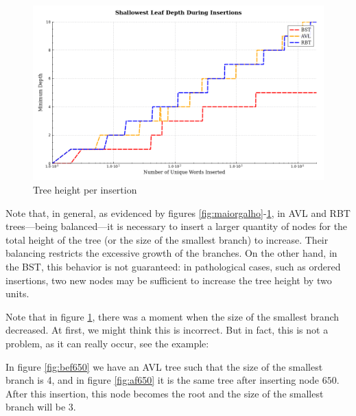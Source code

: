 \begin{figure}[H]
    \centering
    \includegraphics[width=0.75\linewidth]{img/Graph_2_10103.pdf}
    \caption{Tree height per insertion}
    \label{fig:menorgalho}
\end{figure}

Note that, in general, as evidenced by figures \ref{fig:maiorgalho}-\ref{fig:menorgalho}, in AVL and RBT trees—being balanced—it is necessary to insert a larger quantity
of nodes for the total height of the tree (or the size of the smallest branch) to increase. Their balancing restricts the excessive growth of the branches.
On the other hand, in the BST, this behavior is not guaranteed: in pathological cases, such as ordered insertions,
two new nodes may be sufficient to increase the tree height by two units.

Note that in figure \ref{fig:menorgalho}, there was a moment when the size of the smallest branch decreased. At first,
we might think this is incorrect. But in fact, this is not a problem,
as it can really occur, see the example:

In figure \ref{fig:bef650} we have an AVL tree such that the size of the smallest branch is 4, and in figure
\ref{fig:af650} it is the same tree after inserting node $650$. After this insertion,
this node becomes the root and the size of the smallest branch will be 3.

